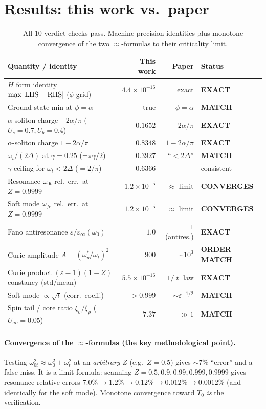 \documentclass[11pt]{article}
\begin{document}
\section{Results: this work vs.\ paper}
\begin{table}[h]
\centering
\begin{tabular}{@{}p{6.4cm}rrl@{}}
\toprule
Quantity / identity & This work & Paper & Status \\
\midrule
$H$ form identity $\max|{\rm LHS-RHS}|$ ($\phi$ grid) & $4.4\times10^{-16}$ & exact & \textbf{EXACT} \\
Ground-state min at $\phi=\alpha$ & true & $\phi=\alpha$ & \textbf{MATCH} \\
$\alpha$-soliton charge $-2\alpha/\pi$ ($U_s{=}0.7,U_b{=}0.4$) & $-0.1652$ & $-2\alpha/\pi$ & \textbf{EXACT} \\
$\alpha$-soliton charge $1-2\alpha/\pi$ & $0.8348$ & $1-2\alpha/\pi$ & \textbf{EXACT} \\
$\omega_t/(2\Delta)$ at $\gamma=0.25$ (=$\pi\gamma/2$) & $0.3927$ & ``$<2\Delta$'' & \textbf{MATCH} \\
$\gamma$ ceiling for $\omega_t<2\Delta$ ($=2/\pi$) & $0.6366$ & --- & consistent \\
Resonance $\omega_{0t}$ rel.\ err.\ at $Z{=}0.9999$ & $1.2\times10^{-5}$ & $\approx$ limit & \textbf{CONVERGES} \\
Soft mode $\omega_{fe}$ rel.\ err.\ at $Z{=}0.9999$ & $1.2\times10^{-5}$ & $\approx$ limit & \textbf{CONVERGES} \\
Fano antiresonance $\varepsilon/\varepsilon_\infty(\omega_0)$ & $1.0$ & $1$ (antires.) & \textbf{EXACT} \\
Curie amplitude $A=(\omega_p^*/\omega_t)^2$ & $900$ & $\sim10^3$ & \textbf{ORDER MATCH} \\
Curie product $(\varepsilon-1)(1-Z)$ constancy (std/mean) & $5.5\times10^{-16}$ & $1/|t|$ law & \textbf{EXACT} \\
Soft mode $\propto\sqrt{t}$ (corr.\ coeff.) & $>0.999$ & $\sim\varepsilon^{-1/2}$ & \textbf{MATCH} \\
Spin tail / core ratio $\xi_\sigma/\xi_\rho$ ($U_{ao}{=}0.05$) & $7.37$ & $\gg1$ & \textbf{MATCH} \\
\bottomrule
\end{tabular}
\caption{All 10 verdict checks pass. Machine-precision identities plus
monotone convergence of the two $\approx$-formulas to their criticality limit.}
\end{table}

\paragraph{Convergence of the $\approx$-formulas (the key methodological point).}
Testing $\omega_{0t}^2\approx\omega_0^2+\omega_t^2$ at an \emph{arbitrary} $Z$
(e.g.\ $Z=0.5$) gives $\sim7\%$ ``error'' and a false miss. It is a limit formula:
scanning $Z=0.5,0.9,0.99,0.999,0.9999$ gives resonance relative errors
$7.0\%\to1.2\%\to0.12\%\to0.012\%\to0.0012\%$ (and identically for the soft mode).
Monotone convergence toward $T_0$ \emph{is} the verification.
\end{document}
